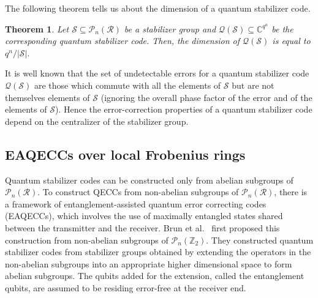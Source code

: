 \documentclass{article}
\newtheorem{thm}{Theorem}[section]
\theoremstyle{remark}
\theoremstyle{definition}
\newtheorem{defin}{Definition}[section]
\numberwithin{equation}{section}
\begin{document}
The following theorem tells us about the dimension of a quantum stabilizer code.
\begin{thm}\label{dim} \cite{luerssen} Let $\mathcal{S} \subseteq \mathcal{P}_n(\mathcal{R}) $ be a stabilizer group and $\mathcal{Q}(\mathcal{S}) \subseteq \mathbb{C}^{q^n}$ be the corresponding quantum stabilizer code. Then, the dimension of $\mathcal{Q}(\mathcal{S})$ is equal to $ q^n/|\mathcal{S}|.$
\end{thm}


It is well known that the set of undetectable errors for a quantum stabilizer code $\mathcal{Q}(\mathcal{S})$ are those which commute with all the elements of $\mathcal{S}$ but are not themselves elements of $\mathcal{S}$ (ignoring the overall phase factor of the error and of the elements of $\mathcal{S}$). Hence the error-correction properties of a quantum stabilizer code depend on the centralizer of the stabilizer group. 

\subsection{EAQECCs over local Frobenius rings}\label{sec:eaqecc}

Quantum stabilizer codes can be constructed only from abelian subgroups of $\mathcal{P}_n(\mathcal{R}).$  To construct QECCs from non-abelian subgroups of $\mathcal{P}_n(\mathcal{R})$, there is a framework of entanglement-assisted quantum error correcting codes (EAQECCs), which involves the use of maximally entangled states shared between the transmitter and the receiver. Brun et al.\ \cite{brun} first proposed this construction from non-abelian subgroups of $\mathcal{P}_n(\mathbb{Z}_2)$. They constructed quantum stabilizer codes from stabilizer groups obtained by extending the operators in the non-abelian subgroups into an appropriate higher dimensional space to form abelian subgroups. The qubits added for the extension, called the entanglement qubits, are assumed to be residing error-free at the receiver end.
\end{document}

